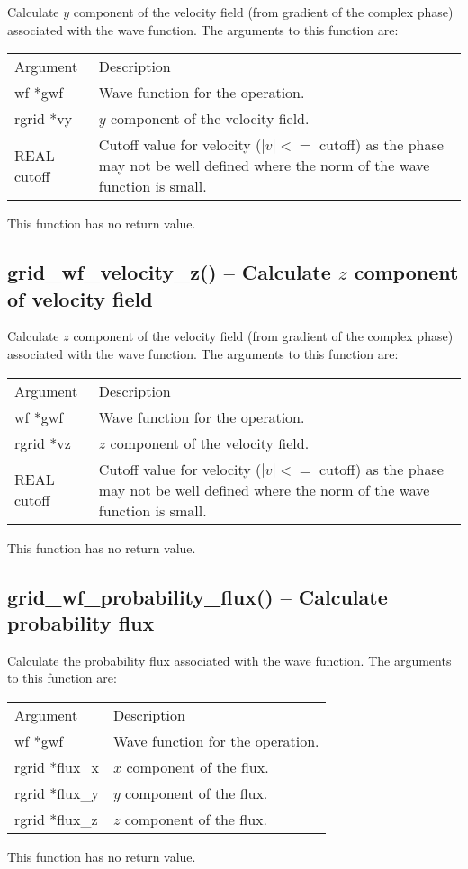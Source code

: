 \documentclass[12pt,letterpaper]{report}
\begin{document}
Calculate $y$ component of the velocity field (from gradient of the complex phase) associated with the wave function. The arguments to this function are:
\begin{longtable}{p{} p{}}
Argument & Description\\
\cline{1-2}
wf *gwf & Wave function for the operation.\\
rgrid *vy & $y$ component of the velocity field.\\
REAL cutoff & Cutoff value for velocity ($|v| <=$ cutoff) as the phase may not be well defined where the norm of the wave function is small.\\
\end{longtable}
\noindent
This function has no return value.

\subsection{grid\_wf\_velocity\_z() -- Calculate $z$ component of velocity field}

Calculate $z$ component of the velocity field (from gradient of the complex phase) associated with the wave function. The arguments to this function are:
\begin{longtable}{p{} p{}}
Argument & Description\\
\cline{1-2}
wf *gwf & Wave function for the operation.\\
rgrid *vz & $z$ component of the velocity field.\\
REAL cutoff & Cutoff value for velocity ($|v| <=$ cutoff) as the phase may not be well defined where the norm of the wave function is small.\\
\end{longtable}
\noindent
This function has no return value.

\subsection{grid\_wf\_probability\_flux() -- Calculate probability flux}

Calculate the probability flux associated with the wave function. The arguments to this function are:
\begin{longtable}{p{} p{}}
Argument & Description\\
\cline{1-2}
wf *gwf & Wave function for the operation.\\
rgrid *flux\_x & $x$ component of the flux.\\
rgrid *flux\_y & $y$ component of the flux.\\
rgrid *flux\_z & $z$ component of the flux.\\
\end{longtable}
\noindent
This function has no return value.
\end{document}
